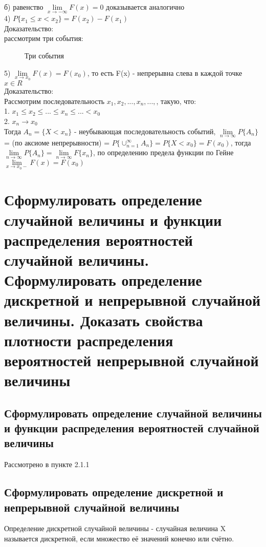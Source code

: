 б) равенство $\lim\limits_{x \rightarrow -\infty} F(x) = 0$ доказывается аналогично\\
4) $P\{x_{1} \leqslant x < x_{2}\} = F(x_{2}) - F(x_{1})$\\
Доказательство:\\
рассмотрим три события:\\
\begin{figure}[H]
	\caption{Три события}
\end{figure}
5) $\lim\limits_{x \rightarrow x_{0}} F(x) = F(x_{0})$, то есть F(x) - непрерывна слева в каждой точке $x \in R$\\
Доказательство:\\
Рассмотрим последовательность $x_{1}, x_{2}, ..., x_{n}, ..., $, такую, что:\\
1. $x_{1} \leqslant x_{2} \leqslant ... \leqslant x_{n} \leqslant ... < x_{0}$\\
2. $x_{n} \rightarrow x_{0}$\\
Тогда $A_{n} = \{ X < x_{n} \}$ - неубывающая последовательность событий, $\lim\limits_{n \rightarrow \infty} P \{A_{n}\}$ = (по аксиоме непрерывности) = $P \{ \cup^{\infty}_{n = 1} A_{n} \} = P \{ X < x_{0} \} = F(x_{0})$, тогда $\lim\limits_{n \rightarrow \infty}  P \{A_{n}\} = \lim\limits_{n \rightarrow \infty}  F \{x_{n}\}$, по определению предела функции по Гейне $\lim\limits_{x \rightarrow x_{0}-} F(x) = F(x_{0})$\\

\section{Сформулировать определение случайной величины и функции распределения вероятностей случайной величины. Сформулировать определение дискретной и непрерывной случайной величины. Доказать свойства плотности распределения вероятностей непрерывной случайной величины}
\subsection{Сформулировать определение случайной величины и функции распределения вероятностей случайной величины}
Рассмотрено в пункте 2.1.1\\
\subsection{Сформулировать определение дискретной и непрерывной случайной величины}
Определение дискретной случайной величины - случайная величина X называется дискретной, если множество её значений конечно или счётно.

